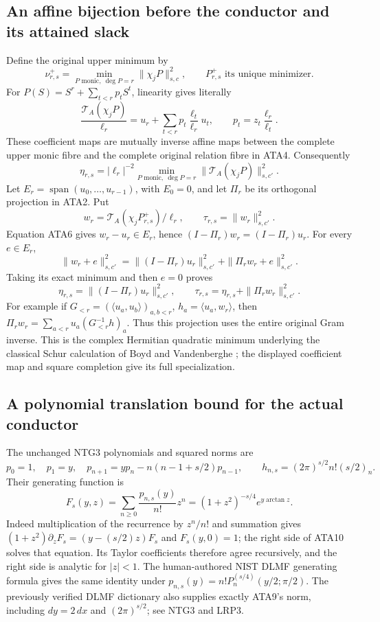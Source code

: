 \documentclass[11pt,a4paper]{article}
\begin{document}
\subsection{An affine bijection before the conductor and its attained slack}
Define the original upper minimum by
\[
 \nu^+_{r,s}=\min_{P\text{ monic},\ \deg P=r}
                      \|\chi_jP\|_{s,c}^2,
 \qquad P^+_{r,s}\text{ its unique minimizer}.           \tag{ATA5}
\]
For $P(S)=S^r+\sum_{t<r}p_tS^t$, linearity gives literally
\[
 \frac{\mathcal T_A(\chi_jP)}{\ell_r}
       =u_r+\sum_{t<r}p_t\frac{\ell_t}{\ell_r}u_t,
 \qquad p_t=z_t\frac{\ell_r}{\ell_t}.                  \tag{ATA6}
\]
These coefficient maps are mutually inverse affine maps between
the complete upper monic fibre and the complete original relation
fibre in ATA4.  Consequently
\[
 \eta_{r,s}=|\ell_r|^{-2}
       \min_{P\text{ monic},\ \deg P=r}
                         \|\mathcal T_A(\chi_jP)\|_{s,c'}^2.
                                                               \tag{ATA7}
\]
Let $E_r=\operatorname{span}(u_0,\ldots,u_{r-1})$, with $E_0=0$,
and let $\Pi_r$ be its orthogonal projection in ATA2.  Put
\[
 w_r=\mathcal T_A(\chi_jP^+_{r,s})/\ell_r,
 \qquad \tau_{r,s}=\|w_r\|_{s,c'}^2.
\]
Equation ATA6 gives $w_r-u_r\in E_r$, hence
$(I-\Pi_r)w_r=(I-\Pi_r)u_r$.  For every $e\in E_r$,
\[
 \|w_r+e\|_{s,c'}^2
 =\|(I-\Pi_r)u_r\|_{s,c'}^2+\|\Pi_rw_r+e\|_{s,c'}^2.
\]
Taking its exact minimum and then $e=0$ proves
\[
 \eta_{r,s}=\|(I-\Pi_r)u_r\|_{s,c'}^2,
 \qquad \tau_{r,s}=\eta_{r,s}+\|\Pi_rw_r\|_{s,c'}^2.    \tag{ATA8}
\]
For example if $G_{<r}=(\langle u_a,u_b\rangle)_{a,b<r}$,
$h_a=\langle u_a,w_r\rangle$, then
$\Pi_rw_r=\sum_{a<r}u_a(G_{<r}^{-1}h)_a$.
Thus this projection uses the entire original Gram inverse.
This is the complex Hermitian quadratic minimum underlying the
classical Schur calculation of Boyd and Vandenberghe
\cite[Appendix A.5.5, p.~650]{human:boyd-vandenberghe}; the displayed
coefficient map and square completion give its full specialization.

\subsection{A polynomial translation bound for the actual conductor}
The unchanged NTG3 polynomials and squared norms are
\[
 p_0=1,\quad p_1=y,\quad
 p_{n+1}=yp_n-n(n-1+s/2)p_{n-1},\qquad
 h_{n,s}=(2\pi)^{s/2}n!(s/2)_n.                          \tag{ATA9}
\]
Their generating function is
\[
 F_s(y,z)=\sum_{n\ge0}\frac{p_{n,s}(y)}{n!}z^n
       =(1+z^2)^{-s/4}e^{y\arctan z}.                  \tag{ATA10}
\]
Indeed multiplication of the recurrence by $z^n/n!$ and summation
gives $(1+z^2)\partial_zF_s=(y-(s/2)z)F_s$ and $F_s(y,0)=1$;
the right side of ATA10 solves that equation.  Its Taylor coefficients
therefore agree recursively, and the right side is analytic for
$|z|<1$.  The human-authored NIST DLMF generating formula
\cite[eq.~(18.23.7)]{human:dlmf18} gives the same identity under
$p_{n,s}(y)=n!P_n^{(s/4)}(y/2;\pi/2)$.  The previously verified
DLMF dictionary also supplies exactly ATA9's norm, including
$dy=2\,dx$ and $(2\pi)^{s/2}$; see NTG3 and LRP3.
\end{document}
